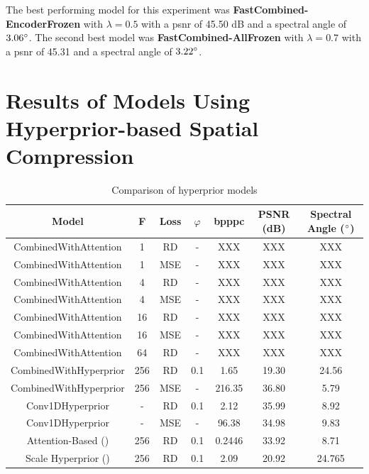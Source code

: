 The best performing model for this experiment was \textbf{FastCombined-EncoderFrozen} with $\lambda=0.5$ with a \ac{psnr} of 45.50 dB and a spectral angle of $3.06 \degree$. The second best model was \textbf{FastCombined-AllFrozen} with $\lambda=0.7$ with a \ac{psnr} of 45.31 and a spectral angle of $3.22 \degree$.

\section{Results of Models Using Hyperprior-based Spatial Compression\label{sec:ch5hyperprior}}
\begin{table}
\centering
\begin{tabular}{|c|c|c|c|c|c|c|}
\hline
Model & F & Loss &$\varphi$ & bpppc & PSNR (dB) & Spectral Angle ($\degree$) \\
\hline\hline
CombinedWithAttention & 1 & RD & - & XXX & XXX & XXX \\
\hline
CombinedWithAttention & 1 & MSE & - & XXX & XXX & XXX \\
\hline
CombinedWithAttention & 4 & RD & - & XXX & XXX & XXX \\
\hline
CombinedWithAttention & 4 & MSE & - & XXX & XXX & XXX \\
\hline
CombinedWithAttention & 16 & RD & - & XXX & XXX & XXX \\
\hline
CombinedWithAttention & 16 & MSE & - & XXX & XXX & XXX \\
\hline
CombinedWithAttention & 64 & RD & - & XXX & XXX & XXX \\
\hline
CombinedWithHyperprior & 256 & RD & 0.1 & 1.65 & 19.30 & 24.56 \\
\hline
CombinedWithHyperprior & 256 & MSE & - & 216.35 & 36.80 & 5.79 \\
\hline
Conv1DHyperprior & - & RD & 0.1 & 2.12 & 35.99 & 8.92 \\
\hline
Conv1DHyperprior & - & MSE & - & 96.38 & 34.98 & 9.83 \\
\hline
Attention-Based (\citep{cheng_learned_2020}) & 256 & RD & 0.1 & 0.2446 & 33.92 & 8.71 \\
\hline
Scale Hyperprior (\citep{balle_variational_2018}) & 256 & RD & 0.1 & 2.09 & 20.92 & 24.765 \\
\hline
\end{tabular}
\caption{Comparison of hyperprior models}
\label{fig:hyperpriorcomp}
\end{table}

